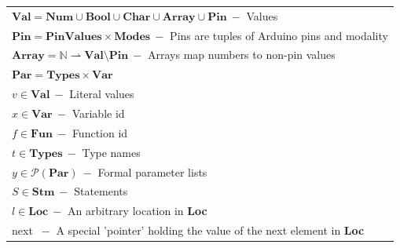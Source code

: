 \begin{table}[htb!]
  \centering
  \begin{tabular}{l}
    \toprule
    $\textbf{Val} = \textbf{Num} \cup \textbf{Bool} \cup \textbf{Char} \cup \textbf{Array} \cup \textbf{Pin}\ -$ Values                                                        \\
    $\textbf{Pin} = \textbf{PinValues} \times \textbf{Modes}\ -$ Pins are tuples of Arduino pins and modality                                                                  \\
    $\textbf{Array} = \mathbb{N} \rightharpoonup \textbf{Val} \setminus \textbf{Pin}\ -$ Arrays map numbers to non-pin values                                                  \\
    $\textbf{Par} = \textbf{Types} \times \textbf{Var}$                                                                                                                        \\
    $v \in \textbf{Val}\ -$ Literal values                                                                                                                                     \\
    $x \in \textbf{Var}\ -$ Variable id                                                                                                                                        \\
    $f \in \textbf{Fun}\ -$ Function id                                                                                                                                        \\
    $t \in \textbf{Types}\ -$ Type names                                                                                                                                       \\
    $y \in \mathcal{P} (\textbf{Par})\ -$ Formal parameter lists                                                                                                               \\
    $S \in \textbf{Stm}\ -$ Statements                                                                                                                                         \\
    $l \in \textbf{Loc}\ -$ An arbitrary location in \textbf{Loc}                                                                                                              \\
    next $\ -$ A special 'pointer' holding the value of the next element in \textbf{Loc}                                                                                       \\

\end{tabular}
\end{table}
